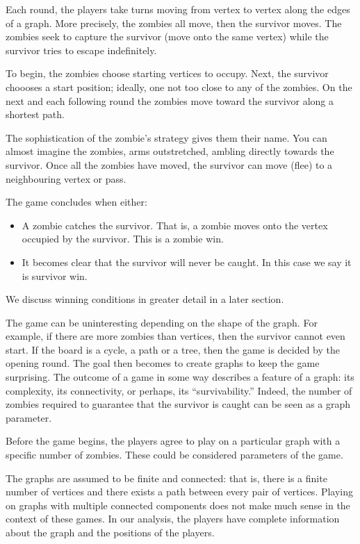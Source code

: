 Each round, the players take turns moving from vertex to vertex along the edges of a graph.
More precisely, the zombies all move, then the survivor moves.
The zombies seek to capture the survivor (move onto the same vertex)
while the survivor tries to escape indefinitely.

To begin, the zombies choose starting vertices to occupy.
Next, the survivor choooses a start position; ideally, one not too close to any of the zombies.
On the next and each following round the zombies move toward the survivor along a shortest path.

The sophistication of the zombie's strategy gives them their name.
You can almost imagine the zombies, arms outstretched, ambling directly towards the survivor.
Once all the zombies have moved, the survivor can move (flee) to a neighbouring vertex or pass.

The game concludes when either:
\begin{itemize}
\item A zombie catches the survivor. That is, a zombie moves onto the vertex
occupied by the survivor. This is a zombie win.
\item It becomes clear that the survivor will never be caught.
In this case we say it is survivor win.
\end{itemize}

We discuss winning conditions in greater detail in a later section.

The game can be uninteresting depending on the shape of the graph.
For example, if there are more zombies than vertices,
then the survivor cannot even start. If the board is a cycle, a path or a tree,
then the game is decided by the opening round.
The goal then becomes to create graphs to keep the game surprising. The outcome of a game in some way describes a feature of
a graph: its complexity, its connectivity, or perhaps, its ``survivability.'' Indeed, the number of zombies required to guarantee
that the survivor is caught can be seen as a graph parameter.

Before the game begins, the players agree to play on a
particular graph with a specific number of zombies. These could be considered
parameters of the game.

The graphs are assumed to be finite and connected: that is, there is a finite
number of vertices and there exists a path between every pair of vertices.
Playing on graphs with multiple connected components does not make much sense in the context of these games.
In our analysis, the players have complete information about the graph and the positions of the players.

